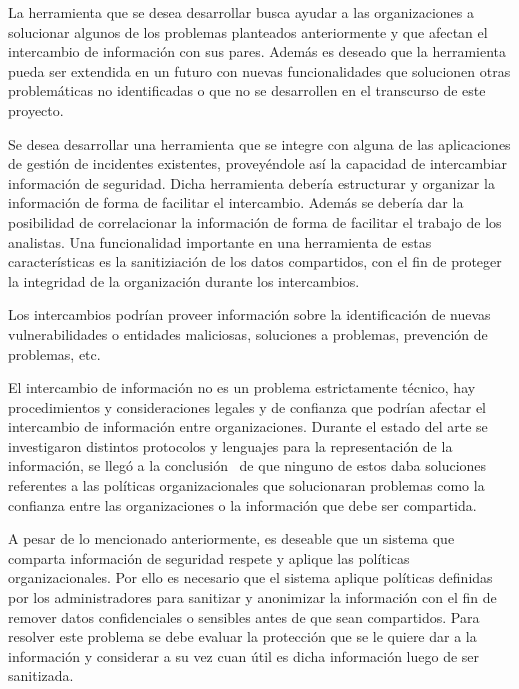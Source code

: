 \bigskip

	La herramienta que se desea desarrollar busca ayudar a las organizaciones a solucionar algunos de los problemas
	planteados anteriormente y que afectan el intercambio de información con sus pares. Además es deseado que la
	herramienta pueda ser extendida en un futuro con nuevas funcionalidades que solucionen otras problemáticas no
	identificadas o que no se desarrollen en el transcurso de este proyecto.


\bigskip

	Se desea desarrollar una herramienta que se integre con alguna de las aplicaciones de gestión de incidentes existentes,
	proveyéndole así la capacidad de intercambiar información de seguridad. Dicha herramienta debería estructurar y organizar
	la información de forma de facilitar el intercambio. Además se debería dar la posibilidad de correlacionar la
	información de forma de facilitar el trabajo de los analistas. Una funcionalidad importante en una herramienta de estas
	características es la sanitiziación de los datos compartidos, con el fin de proteger la integridad de la organización
	durante los intercambios.


\bigskip

	Los intercambios podrían proveer información sobre la identificación de nuevas vulnerabilidades o entidades maliciosas,
	soluciones a problemas, prevención de problemas, etc. 


\bigskip

	El intercambio de información no es un problema estrictamente técnico, hay procedimientos y consideraciones legales y de
	confianza que podrían afectar el intercambio de información entre organizaciones. Durante el estado del arte se
	investigaron distintos protocolos y lenguajes para la representación de la información, se llegó a la conclusión \ de
	que ninguno de estos daba soluciones referentes a las políticas organizacionales que solucionaran problemas como la
	confianza entre las organizaciones o la información que debe ser compartida.


\bigskip

	A pesar de lo mencionado anteriormente, es deseable que un sistema que comparta información de seguridad respete y
	aplique las políticas organizacionales. Por ello es necesario que el sistema aplique políticas definidas por los
	administradores para sanitizar y anonimizar la información con el fin de remover datos confidenciales o sensibles antes
	de que sean compartidos. Para resolver este problema se debe evaluar la protección que se le quiere dar a la
	información y considerar a su vez cuan útil es dicha información luego de ser sanitizada.\\

